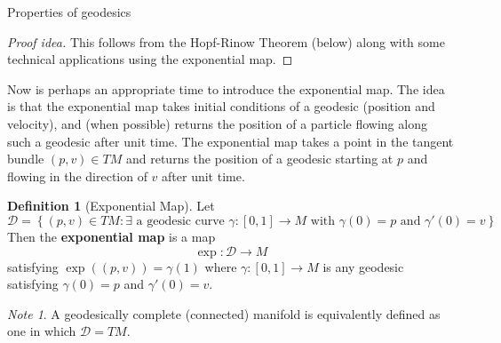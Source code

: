 \documentclass{article}
\newcommand{\fn}[3]{#1 \colon #2 \rightarrow #3}
\newcommand{\set}[1]{\left\{#1\right\}}
\theoremstyle{definition}
\newtheorem{definition}{Definition}[section]
\theoremstyle{remark}
\newtheorem{remark}{Note}[section]
\newtheorem{theorem}{Theorem}[section]
\begin{document}
\begin{section}{Properties of geodesics}
  \begin{proof}[Proof idea]
    This follows from the Hopf-Rinow Theorem (below) along with some technical
    applications using the exponential map.
  \end{proof}

  Now is perhaps an appropriate time to introduce the exponential map. The idea
  is that the exponential map takes initial conditions of a geodesic
  (position and velocity), and (when possible) returns the position of a particle
  flowing along such a geodesic after unit time.
  The exponential map takes a point in the tangent bundle
  $(p, v) \in TM$ and returns the position of a geodesic starting at $p$
  and flowing in the direction of $v$ after unit time.
  \begin{definition}[Exponential Map]
    Let \[
      \mathcal D = \set{ (p, v) \in TM :
        \exists
        \text{ a geodesic curve }
        \fn \gamma {[0, 1]} M
        \text{ with }
        \gamma(0) = p
        \text{ and }
        \gamma'(0) = v
      }
    \]
    Then the \textbf{exponential map} is a map \[
      \fn {\exp} {\mathcal D} M
    \] satisfying $\exp((p, v)) = \gamma(1)$ where
    $\fn \gamma {[0, 1]} M$ is any geodesic satisfying $\gamma(0) = p$ and
    $\gamma'(0) = v$.
  \end{definition}
  \begin{remark}
    A geodesically complete (connected) manifold is equivalently defined as one
    in which $\mathcal D = TM$.
  \end{remark}

\end{section}
\end{document}
